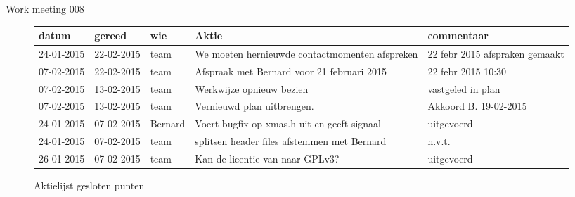 \documentclass[a4paper,final]{article}
\begin{document}
\begin{Minutes}{Work meeting 008}
\begin{figure}
\begin{tabular}[!h]{|l|l|l|p{10em}|p{10em}|}
\hline
{\bf datum} & {\bf gereed} & {\bf wie} & {\bf Aktie}                                      & commentaar      \\\hline
24-01-2015  & 22-02-2015   & team      & We moeten hernieuwde contactmomenten afspreken   & 22 febr 2015 afspraken gemaakt\\\hline
07-02-2015  & 22-02-2015   & team      & Afspraak met Bernard voor 21 februari 2015       & 22 febr 2015 10:30\\\hline
07-02-2015  & 13-02-2015   & team      & Werkwijze opnieuw bezien                         & vastgeled in plan\\\hline
07-02-2015  & 13-02-2015   & team      & Vernieuwd plan uitbrengen.                       & Akkoord B. 19-02-2015\\\hline
24-01-2015  & 07-02-2015   & Bernard   & Voert bugfix op xmas.h uit en geeft signaal      & uitgevoerd\\\hline
24-01-2015  & 07-02-2015   & team      & splitsen header files afstemmen met Bernard      & n.v.t.\\\hline
26-01-2015  & 07-02-2015   & team      & Kan de licentie van \w{bitpower lib} naar GPLv3? & uitgevoerd\\\hline
\end{tabular}
\caption{Aktielijst gesloten punten}
\end{figure}

\end{Minutes}
\end{document}
